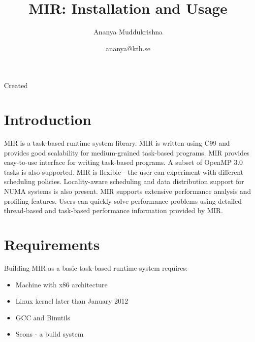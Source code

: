 \documentclass[11pt,a4paper,notitlepage]{article}
\title{MIR: Installation and Usage}
\author{Ananya Muddukrishna}
\date{ananya@kth.se}
\begin{document}
\maketitle

\begin{versionhistory}
 {Created}
\end{versionhistory}

\section{Introduction}
MIR is a task-based runtime system library.
MIR is written using C99 and provides good scalability for medium-grained task-based programs. 
MIR provides easy-to-use interface for writing task-based programs.
A subset of OpenMP 3.0 tasks is also supported.
MIR is flexible - the user can experiment with different scheduling policies.
Locality-aware scheduling and data distribution support for NUMA systems is also present.
MIR supports extensive performance analysis and profiling features.
Users can quickly solve performance problems using detailed thread-based and task-based performance information provided by MIR.

\section{Requirements}
Building MIR as a basic task-based runtime system requires:
\begin{itemize}
\item Machine with x86 architecture
\item Linux kernel later than January 2012
\item GCC and Binutils
\item Scons - a build system
\end{itemize}
\end{document}
